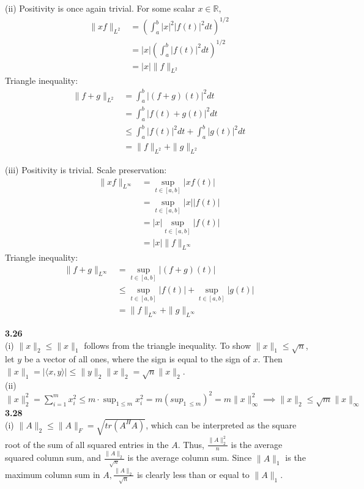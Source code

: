 \documentclass[letterpaper,12pt]{article}
\theoremstyle{definition}
\begin{document}
\noindent(ii) Positivity is once again trivial. For some scalar $x \in \mathbb{R}$,
\begin{align*}
\|xf\|_{L^2} &= (\int_a^b |x|^2|f(t)|^2 dt)^{1/2}\\
&= |x|(\int_a^b|f(t)|^2dt)^{1/2}\\
&= |x|\|f\|_{L^2}
\end{align*}
Triangle inequality:
\begin{align*}
\|f+g\|_{L^2} &= \int_a^b |(f+g)(t)|^2dt\\
&= \int_a^b |f(t)+g(t)|^2dt\\
&\leq \int_a^b |f(t)|^2dt + \int_a^b |g(t)|^2dt\\
&= \|f\|_{L^2} +\|g\|_{L^2} 
\end{align*}

\noindent (iii) Positivity is trivial. Scale preservation:
\begin{align*}
\|xf\|_{L^\infty} &= \sup_{t \in [a,b]}|xf(t)|\\
&= \sup_{t \in [a,b]} |x||f(t)|\\
&= |x| \sup_{t \in [a,b]} |f(t)|\\
&= |x|\|f\|_{L^\infty}
\end{align*}
Triangle inequality:
\begin{align*}
\|f+g\|_{L^\infty} &= \sup_{t \in [a,b]} |(f+g)(t)|\\
&\leq \sup_{t \in [a,b]} |f(t)| + \sup_{t \in [a,b]} |g(t)|\\
&= \|f\|_{L^\infty} + \|g\|_{L^\infty}
\end{align*}

\noindent\textbf{3.26}\\
(i) $\|x\|_2 \leq \|x\|_1$ follows from the triangle inequality. To show $\|x\|_1 \leq \sqrt{n}$, let $y$ be a vector of all ones, where the sign is equal to the sign of $x$. Then $\|x\|_1 = | \langle x,y \rangle| \leq \|y\|_2\|x\|_2 = \sqrt{n}\|x\|_2$.\\

\noindent(ii) $\|x\|_2^2 = \sum_{i=1}^{m}x_i^2 \leq m \cdot \sup_{1 \leq m} x_i^2 = m(sup_{1\ \leq m})^2 = m\|x\|_\infty^2 \implies \|x\|_2 \leq \sqrt{m} \|x\|_\infty$\\

\noindent\textbf{3.28}\\
(i) $\|A\|_2 \leq \|A\|_F = \sqrt{tr(A^HA)} $, which can be interpreted as the square root of the sum of all squared entries in the $A$. Thus, $\frac{\|A\|_2^2}{n}$ is the average squared column sum, and $\frac{\|A\|_2}{\sqrt{n}}$ is the average column sum. Since $\|A\|_1$ is the maximum column sum in $A, \frac{\|A\|_2}{\sqrt{n}}$ is clearly less than or equal to $\|A\|_1$.\\
\end{document}
